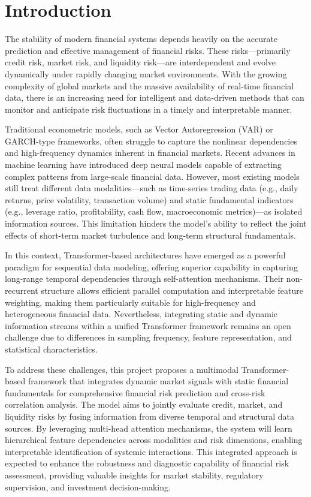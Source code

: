 \section{Introduction}
\label{sec:Introduction}
The stability of modern financial systems depends heavily on the accurate prediction and effective management of financial risks.
These risks—primarily credit risk, market risk, and liquidity risk—are interdependent and evolve dynamically under rapidly changing market environments.
With the growing complexity of global markets and the massive availability of real-time financial data, there is an increasing need for intelligent and data-driven methods that can monitor and anticipate risk fluctuations in a timely and interpretable manner.

Traditional econometric models, such as Vector Autoregression (VAR) or GARCH-type frameworks, often struggle to capture the nonlinear dependencies and high-frequency dynamics inherent in financial markets.
Recent advances in machine learning have introduced deep neural models capable of extracting complex patterns from large-scale financial data.
However, most existing models still treat different data modalities—such as time-series trading data (e.g., daily returns, price volatility, transaction volume) and static fundamental indicators (e.g., leverage ratio, profitability, cash flow, macroeconomic metrics)—as isolated information sources.
This limitation hinders the model’s ability to reflect the joint effects of short-term market turbulence and long-term structural fundamentals.

In this context, Transformer-based architectures have emerged as a powerful paradigm for sequential data modeling, offering superior capability in capturing long-range temporal dependencies through self-attention mechanisms.
Their non-recurrent structure allows efficient parallel computation and interpretable feature weighting, making them particularly suitable for high-frequency and heterogeneous financial data.
Nevertheless, integrating static and dynamic information streams within a unified Transformer framework remains an open challenge due to differences in sampling frequency, feature representation, and statistical characteristics.

To address these challenges, this project proposes a multimodal Transformer-based framework that integrates dynamic market signals with static financial fundamentals for comprehensive financial risk prediction and cross-risk correlation analysis.
The model aims to jointly evaluate credit, market, and liquidity risks by fusing information from diverse temporal and structural data sources.
By leveraging multi-head attention mechanisms, the system will learn hierarchical feature dependencies across modalities and risk dimensions, enabling interpretable identification of systemic interactions.
This integrated approach is expected to enhance the robustness and diagnostic capability of financial risk assessment, providing valuable insights for market stability, regulatory supervision, and investment decision-making.